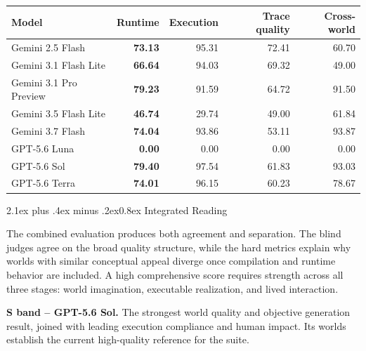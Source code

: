 \documentclass[11pt,a4paper]{article}
\makeatletter
\renewcommand\section{\@startsection{section}{1}{0pt}%
  {2.1ex plus .4ex minus .2ex}{0.8ex}%
  {\color{AgoraInk}\sffamily\Large\bfseries}}
\makeatother
\begin{document}
\begin{table}[H]
\centering
\small
\begin{tabularx}{\textwidth}{@{}Lrrrr@{}}
\toprule
\textbf{Model} & \textbf{Runtime} & \textbf{Execution} & \textbf{Trace quality} & \textbf{Cross-world} \\
\midrule
Gemini 2.5 Flash & \textbf{73.13} & 95.31 & 72.41 & 60.70 \\
Gemini 3.1 Flash Lite & \textbf{66.64} & 94.03 & 69.32 & 49.00 \\
Gemini 3.1 Pro Preview & \textbf{79.23} & 91.59 & 64.72 & 91.50 \\
Gemini 3.5 Flash Lite & \textbf{46.74} & 29.74 & 49.00 & 61.84 \\
Gemini 3.7 Flash & \textbf{74.04} & 93.86 & 53.11 & 93.87 \\
GPT-5.6 Luna & \textbf{0.00} & 0.00 & 0.00 & 0.00 \\
GPT-5.6 Sol & \textbf{79.40} & 97.54 & 61.83 & 93.03 \\
GPT-5.6 Terra & \textbf{74.01} & 96.15 & 60.23 & 78.67 \\
\bottomrule
\end{tabularx}
\end{table}

\clearpage
\section{Integrated Reading}

The combined evaluation produces both agreement and separation. The blind judges agree on the broad
quality structure, while the hard metrics explain why worlds with similar conceptual appeal diverge
once compilation and runtime behavior are included. A high comprehensive score requires strength
across all three stages: world imagination, executable realization, and lived interaction.

\vspace{2mm}
\colorbox{AgoraPaleTeal}{%
  \parbox{0.96\textwidth}{%
    \vspace{3mm}\hspace{3mm}\begin{minipage}{0.91\textwidth}
    \sffamily\color{AgoraInk}
    \textbf{S band -- GPT-5.6 Sol.} The strongest world quality and objective generation result,
    joined with leading execution compliance and human impact. Its worlds establish the current
    high-quality reference for the suite.
    \end{minipage}\vspace{3mm}}}
\end{document}
